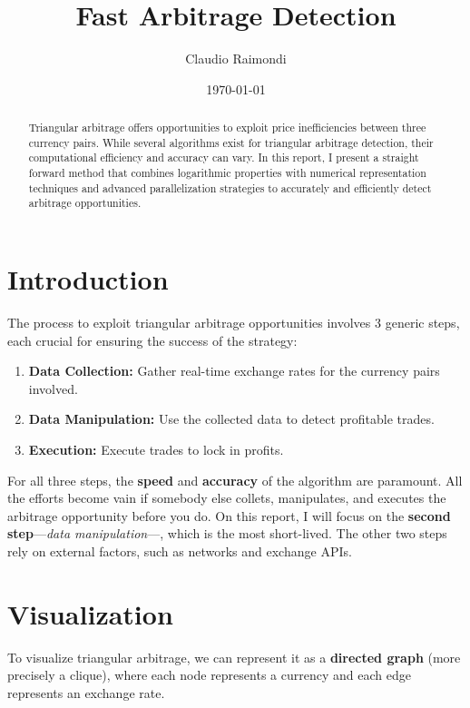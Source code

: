 \documentclass[11pt]{article}
\begin{document}
\title{Fast Arbitrage Detection}
\author{Claudio Raimondi}
\date{\today}
\maketitle

\begin{abstract}
Triangular arbitrage offers opportunities to exploit price inefficiencies between three currency pairs. While several algorithms exist for triangular arbitrage detection, their computational efficiency and accuracy can vary. In this report, I present a straight forward method that combines logarithmic properties with numerical representation techniques and advanced parallelization strategies to accurately and efficiently detect arbitrage opportunities.
\end{abstract}

\tableofcontents

\section{Introduction}
The process to exploit triangular arbitrage opportunities involves 3 generic steps, each crucial for ensuring the success of the strategy:
\begin{enumerate}
    \item \textbf{Data Collection:} Gather real-time exchange rates for the currency pairs involved.
    \item \textbf{Data Manipulation:} Use the collected data to detect profitable trades.
    \item \textbf{Execution:} Execute trades to lock in profits.
\end{enumerate}
For all three steps, the \textbf{speed} and \textbf{accuracy} of the algorithm are paramount. All the efforts become vain if somebody else collets, manipulates, and executes the arbitrage opportunity before you do.
On this report, I will focus on the \textbf{second step}---\textit{data manipulation}---, which is the most short-lived. The other two steps rely on external factors, such as networks and exchange APIs.

\section{Visualization}
To visualize triangular arbitrage, we can represent it as a \textbf{directed graph} (more precisely a clique), where each node represents a currency and each edge represents an exchange rate.
\end{document}
